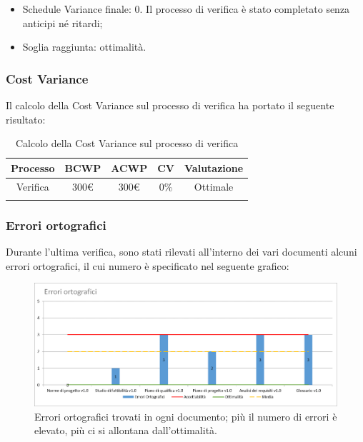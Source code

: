 \begin{itemize}
	\item Schedule Variance finale: 0. 
	Il processo di verifica è stato completato senza anticipi né ritardi;
	
	\item Soglia raggiunta: ottimalità.
\end{itemize}


\subsubsection{Cost Variance}
Il calcolo della Cost Variance sul processo di verifica ha portato il seguente risultato: 

{
	\renewcommand{\arraystretch}{2}
	\centering
	\begin{longtable}{| c | c | c | c | c |}
		\hline
		\textbf{Processo} & \textbf{BCWP} & \textbf{ACWP} & \textbf{CV} & \textbf{Valutazione} \\
		\hline
		Verifica & 300\euro & 300\euro & 0\% & Ottimale \\
		\hline
		\caption{Calcolo della Cost Variance sul processo di verifica}
	\end{longtable}
	
}

\newpage

\subsubsection{Errori ortografici}
Durante l'ultima verifica, sono stati rilevati all'interno dei vari documenti alcuni errori ortografici, il cui numero è specificato nel seguente grafico:

\begin{figure}[h!]
	\centering
	\includegraphics[scale=0.6]{img/Grafici/Errori_orto.png}
	\caption{Errori ortografici trovati in ogni documento; più il numero di errori è elevato, più ci si allontana dall'ottimalità.}
	\label{fig:Errori_orto}
\end{figure}

